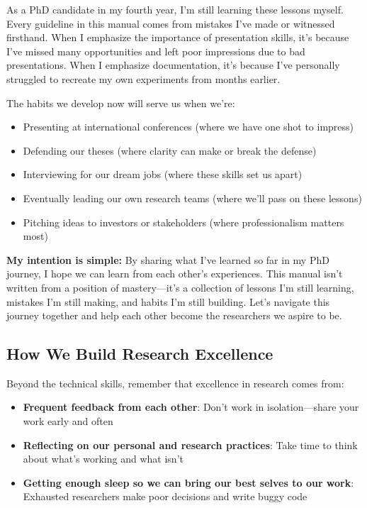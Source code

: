 \documentclass[11pt,a4paper]{article}
\begin{document}
As a PhD candidate in my fourth year, I'm still learning these lessons myself. Every guideline in this manual comes from mistakes I've made or witnessed firsthand. When I emphasize the importance of presentation skills, it's because I've missed many opportunities and left poor impressions due to bad presentations. When I emphasize documentation, it's because I've personally struggled to recreate my own experiments from months earlier.

The habits we develop now will serve us when we're:
\begin{itemize}
    \item Presenting at international conferences (where we have one shot to impress)
    \item Defending our theses (where clarity can make or break the defense)
    \item Interviewing for our dream jobs (where these skills set us apart)
    \item Eventually leading our own research teams (where we'll pass on these lessons)
    \item Pitching ideas to investors or stakeholders (where professionalism matters most)
\end{itemize}

\textbf{My intention is simple:} By sharing what I've learned so far in my PhD journey, I hope we can learn from each other's experiences. This manual isn't written from a position of mastery—it's a collection of lessons I'm still learning, mistakes I'm still making, and habits I'm still building. Let's navigate this journey together and help each other become the researchers we aspire to be.

\subsection{How We Build Research Excellence}

Beyond the technical skills, remember that excellence in research comes from:
\begin{itemize}
    \item \textbf{Frequent feedback from each other}: Don't work in isolation—share your work early and often
    \item \textbf{Reflecting on our personal and research practices}: Take time to think about what's working and what isn't
    \item \textbf{Getting enough sleep so we can bring our best selves to our work}: Exhausted researchers make poor decisions and write buggy code
\end{itemize}
\end{document}
